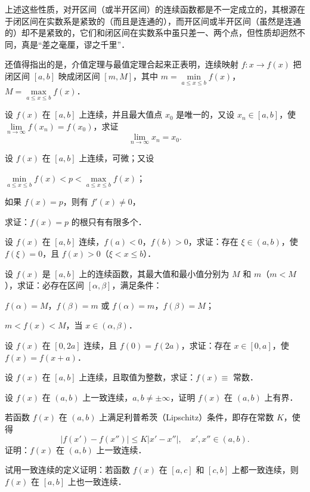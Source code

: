 上述这些性质，对开区间（或半开区间）的连续函数都是不一定成立的，其根源在于闭区间在实数系是紧致的（而且是连通的），而开区间或半开区间（虽然是连通的）却不是紧致的，它们和闭区间在实数系中虽只差一、两个点，但性质却迥然不同，真是“差之毫厘，谬之千里”．

还值得指出的是，介值定理与最值定理合起来正表明，连续映射 $f: x \to f(x)$ 把闭区间 $[a, b]$ 映成闭区间 $[m, M]$，其中 $m = \min\limits_{a \leqslant x \leqslant b} f(x)$，$M = \max\limits_{a \leqslant x \leqslant b} f(x)$．

\begin{xiti}
\item 设 $f(x)$ 在 $[a, b]$ 上连续，并且最大值点 $x_0$ 是唯一的，又设 $x_n \in [a, b]$，使 $\lim\limits_{n \to \infty} f(x_n) = f(x_0)$，求证
\[
\lim_{n \to \infty} x_n = x_0.
\]
\item 设 $f(x)$ 在 $[a, b]$ 上连续，可微；又设
\begin{ziti}
\item $\min\limits_{a \leqslant x \leqslant b} f(x) < p < \max\limits_{a \leqslant x \leqslant b} f(x)$；
\item 如果 $f(x) = p$，则有 $f'(x) \neq 0$，
\end{ziti}
求证：$f(x) = p$ 的根只有有限多个．
\item 设 $f(x)$ 在 $[a, b]$ 连续，$f(a) < 0$，$f(b) > 0$，求证：存在 $\xi \in (a, b)$，使 $f(\xi) = 0$，且 $f(x) > 0$（$\xi < x \leqslant b$）．
\item 设 $f(x)$ 是 $[a, b]$ 上的连续函数，其最大值和最小值分别为 $M$ 和 $m$（$m < M$），求证：必存在区间 $[\alpha, \beta]$，满足条件：
\begin{ziti}
\item $f(\alpha) = M$，$f(\beta) = m$ 或 $f(\alpha) = m$，$f(\beta) = M$；
\item $m < f(x) < M$，当 $x \in (\alpha, \beta)$．
\end{ziti}
\item 设 $f(x)$ 在 $[0, 2a]$ 连续，且 $f(0) = f(2a)$，求证：存在 $x \in [0, a]$，使 $f(x) = f(x + a)$．
\item 设 $f(x)$ 在 $[a, b]$ 上连续，且取值为整数，求证：$f(x) \equiv$ 常数．
\item 设 $f(x)$ 在 $(a, b)$ 上一致连续，$a, b \neq \pm\infty$，证明 $f(x)$ 在 $(a, b)$ 上有界．
\item 若函数 $f(x)$ 在 $(a, b)$ 上满足利普希茨（Lipschitz）条件，即存在常数 $K$，使得
\[
|f(x') - f(x'')| \leqslant K |x' - x''|, \quad x', x'' \in (a, b).
\]
证明：$f(x)$ 在 $(a, b)$ 上一致连续．
\item 试用一致连续的定义证明：若函数 $f(x)$ 在 $[a, c]$ 和 $[c, b]$ 上都一致连续，则 $f(x)$ 在 $[a, b]$ 上也一致连续．

\end{xiti}
